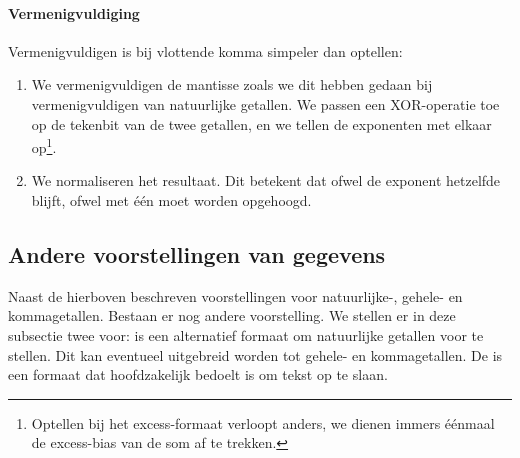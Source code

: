 \paragraph{Vermenigvuldiging}
Vermenigvuldigen is bij vlottende komma simpeler dan optellen:
\begin{enumerate}
 \item We vermenigvuldigen de mantisse zoals we dit hebben gedaan bij vermenigvuldigen van natuurlijke getallen. We passen een XOR-operatie toe op de tekenbit van de twee getallen, en we tellen de exponenten met elkaar op\footnote{Optellen bij het excess-formaat verloopt anders, we dienen immers \'e\'enmaal de excess-bias van de som af te trekken.}.
 \item We normaliseren het resultaat. Dit betekent dat ofwel de exponent hetzelfde blijft, ofwel met \'e\'en moet worden opgehoogd.
\end{enumerate}
\subsection{Andere voorstellingen van gegevens}
\label{ss:otherRepresentations}
Naast de hierboven beschreven voorstellingen voor natuurlijke-, gehele- en kommagetallen. Bestaan er nog andere voorstelling. We stellen er in deze subsectie twee voor:  is een alternatief formaat om natuurlijke getallen voor te stellen. Dit kan eventueel uitgebreid worden tot gehele- en kommagetallen. De  is een formaat dat hoofdzakelijk bedoelt is om tekst op te slaan.
